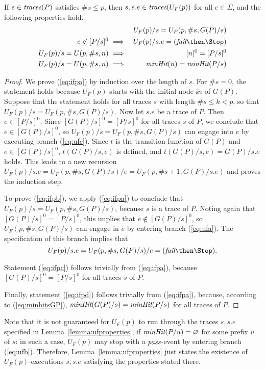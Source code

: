 \begin{lemma}\label{lemma:ufproperties}
If $s\in\text{\it traces}(P)$ satisfies $\#s\le p$, then
$s, s.e\in\text{\it traces}(U_F(p))$ for all $e\in\Sigma$, and the following properties hold.
\begin{eqnarray}
\label{eq:ifpa}
  &  & U_F(p)/s = U_F(p,\#s,G(P)/s)
\\
\label{eq:ifpb}
e\not\in [P/s]^0 & \implies & U_F(p)/s.e = (\efail\then\Stop)
\\
\label{eq:ifpc}
U_F(p)/s = U(p,\# s,n)  & \implies & [n]^0 = [P/s]^0  
\\
\label{eq:ifpd}
U_F(p)/s = U(p,\# s,n)  & \implies & \minhits(n) = \minhits(P/s)
\end{eqnarray}
\end{lemma}
\begin{proof}
We prove (\ref{eq:ifpa}) by induction over the length of $s$. For $\#s = 0$, the statement holds because $U_F(p)$ starts with the initial node $\ii n$ of $G(P)$. Suppose that 
the statement holds for all traces $s$ with length $\# s \le k < p$, so that
$U_F(p)/s = U_F(p,\#s,G(P)/s)$. Now let $s.e$ be a trace of $P$. Then $e\in [P/s]^0$. Since $[G(P)/s]^0 = [P/s]^0$ for all traces $s$ of $P$, we conclude that $e\in  [G(P)/s]^0$,
so $U_F(p)/s = U_F(p,\#s,G(P)/s)$ can engage into $e$ by executing branch (\ref{eq:ufc}).
 Since $t$ is the transition function of $G(P)$ and $e\in  [G(P)/s]^0$, $t(G(P)/s,e)$
 is defined, and $t(G(P)/s,e) = G(P)/s.e$ holds.
This leads to a new recursion  
$U_F(p)/s.e = U_F(p,\#s,G(P)/s)/e = U_F(p,\#s+1,G(P)/s.e)$ and proves the induction step.

To prove (\ref{eq:ifpb}), we apply (\ref{eq:ifpa}) to conclude that 
$U_F(p)/s = U_F(p,\#s,G(P)/s)$, because $s$ is a trace of $P$. Noting again that
$[G(P)/s]^0 = [P/s]^0$, this implies that $e\not\in [G(P)/s]^0$, so $U_F(p,\#s,G(P)/s)$
can engage in $e$ by entering branch (\ref{eq:ufa}). The specification of this branch
implies that 
$$
U_F(p)/s.e = U_F(p,\#s,G(P)/s)/e = (\efail\then\Stop).
$$

Statement (\ref{eq:ifpc}) follows trivially from (\ref{eq:ifpa}), because 
$[G(P)/s]^0 = [P/s]^0$ for all traces $s$ of $P$.

Finally, statement (\ref{eq:ifpd}) follows trivially from (\ref{eq:ifpa}), because,
according to (\ref{eq:minhitsGP}),
$\text{\it minHit}(G(P)/s) = \text{\it minHit}(P/s)$ for all traces of $P$.
\xbox
\end{proof}

Note that it is not guaranteed for $U_F(p)$ to run through the traces $s, s.e$ specified 
in Lemma~\ref{lemma:ufproperties}, if $\text{\it minHit}(P/u) = \varnothing$ for some prefix $u$ of $s$: in such a case, $U_F(p)$ may stop with a ${\text{\it pass}}$-event by entering branch (\ref{eq:ufb}). Therefore, Lemma~\ref{lemma:ufproperties} just states the existence of
$U_F(p)$-executions $s, s.e$ satisfying the properties stated there.



